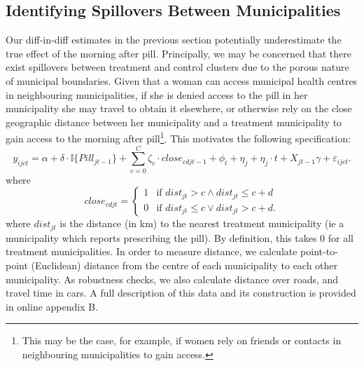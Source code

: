 \subsection{Identifying Spillovers Between Municipalities}
\label{TEENsscn:spilloverID}
Our diff-in-diff estimates in the previous section potentially underestimate the 
true effect of the morning after pill.  Principally, we may be concerned that
there exist spillovers between treatment and control clusters due to the porous
nature of municipal boundaries. Given that a woman can access municipal health
centres in neighbouring municipalities, if she is denied access to the pill in 
her municipality she may travel to obtain it elsewhere, or otherwise rely on the 
close geographic distance between her municipality and a treatment municipality 
to gain access to the morning after pill\footnote{This may be the case, for 
example, if women rely on friends or contacts in neighbouring municipalities to 
gain access.}.  This motivates the following specification:
\begin{equation}
 \label{TEENeqn:spillover}
y_{ijct} = \alpha + \delta\cdot \mathbb{I}\{Pill_{jt-1}\} + 
\sum_{c=0}^C\zeta_c\cdot close_{cdjt-1} + \phi_t + \eta_j + \eta_j\cdot t +
X_{jt-1}\gamma + \varepsilon_{ijct}.
\end{equation}
where
\[
 close_{cdjt} =
  \begin{cases}
   1 & \text{if } dist_{jt} > c \wedge dist_{jt}\leq c+d   \\
   0 & \text{if } dist_{jt} \leq c \vee  dist_{jt}>c+d.
  \end{cases}
\]
where $dist_{jt}$ is the distance (in km) to the nearest treatment municipality 
(ie a municipality which reports prescribing the pill).  By definition, this takes
0 for all treatment municipalities.  In order to measure distance, we calculate
point-to-point (Euclidean) distance from the centre of each municipality to each
other municipality.  As robustness checks, we also calculate distance over roads,
and travel time in cars.  A full description of this data and its construction is
provided in online appendix B.

